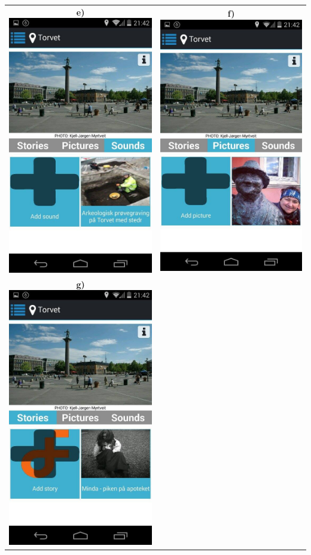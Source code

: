 \documentclass[12pt,a4paper,titlepage]{article}
\begin{document}
\begin{center}
\begin{tabular}{cc}
	 	\textbf{e)\hspace{0.2in}}\includegraphics[width=0.35 \textwidth]{res/ScreenShot5.jpg}	& 	
	 	\textbf{f)\hspace{0.2in}}\includegraphics[width=0.35 \textwidth]{res/ScreenShot6.jpg}\\
	 	\textbf{g)\hspace{0.2in}}\includegraphics[width=0.35 \textwidth]{res/ScreenShot7.jpg}	&

\end{tabular}
\end{center}
\end{document}
